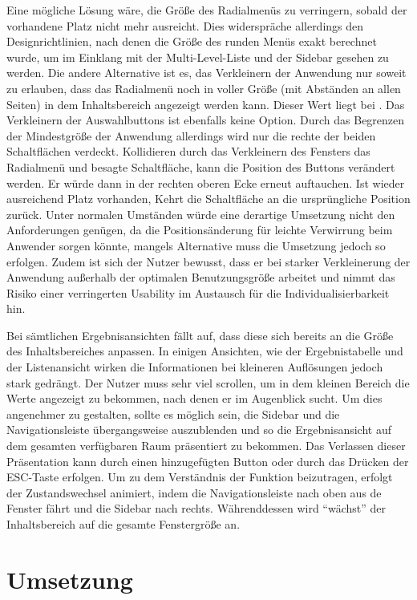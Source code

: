 Eine mögliche Lösung wäre, die Größe des Radialmenüs zu verringern, sobald der vorhandene Platz nicht mehr ausreicht. Dies widerspräche allerdings den Designrichtlinien, nach denen die Größe des runden Menüs exakt berechnet wurde, um im Einklang mit der Multi-Level-Liste und der Sidebar gesehen zu werden. Die andere Alternative ist es, das Verkleinern der Anwendung nur soweit zu erlauben, dass das Radialmenü noch in voller Größe (mit Abständen an allen Seiten) in dem Inhaltsbereich angezeigt werden kann. Dieser Wert liegt bei . Das Verkleinern der Auswahlbuttons ist ebenfalls keine Option. Durch das Begrenzen der Mindestgröße der Anwendung allerdings wird nur die rechte der beiden Schaltflächen verdeckt. Kollidieren durch das Verkleinern des Fensters das Radialmenü und besagte Schaltfläche, kann die Position des Buttons verändert werden. Er würde dann in der rechten oberen Ecke erneut auftauchen. Ist wieder ausreichend Platz vorhanden, Kehrt die Schaltfläche an die ursprüngliche Position zurück. Unter normalen Umständen würde eine derartige Umsetzung nicht den Anforderungen genügen, da die Positionsänderung für leichte Verwirrung beim Anwender sorgen könnte, mangels Alternative muss die Umsetzung jedoch so erfolgen. Zudem ist sich der Nutzer bewusst, dass er bei starker Verkleinerung der Anwendung außerhalb der optimalen Benutzungsgröße arbeitet und nimmt das Risiko einer verringerten Usability im Austausch für die Individualisierbarkeit hin.\par
{}
Bei sämtlichen Ergebnisansichten fällt auf, dass diese sich bereits an die Größe des Inhaltsbereiches anpassen. In einigen Ansichten, wie der Ergebnistabelle und der Listenansicht wirken die Informationen bei kleineren Auflösungen jedoch stark gedrängt. Der Nutzer muss sehr viel scrollen, um in dem kleinen Bereich die Werte angezeigt zu bekommen, nach denen er im Augenblick sucht. Um dies angenehmer zu gestalten, sollte es möglich sein, die Sidebar und die Navigationsleiste übergangsweise auszublenden und so die Ergebnisansicht auf dem gesamten verfügbaren Raum präsentiert zu bekommen. Das Verlassen dieser Präsentation kann durch einen hinzugefügten Button oder durch das Drücken der ESC-Taste erfolgen. Um zu dem Verständnis der Funktion beizutragen, erfolgt der Zustandswechsel animiert, indem die Navigationsleiste nach oben aus de Fenster fährt und die Sidebar nach rechts. Währenddessen wird \enquote{wächst} der Inhaltsbereich auf die gesamte Fenstergröße an.
\section{Umsetzung} \label{sec:responsiveImplementation}
